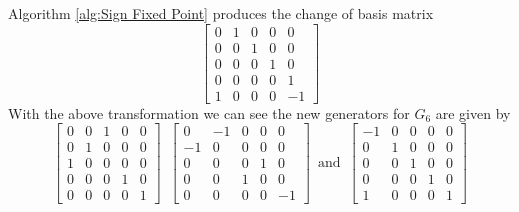 \documentclass{article}
\theoremstyle{plain}
\theoremstyle{definition}
\newcommand{\tand}{\ensuremath{\,\,\, \text{and} \,\,\,}}
\begin{document}
%
Algorithm \ref{alg:Sign Fixed Point} produces the change of basis matrix 
$$
 \left[ \begin {array}{ccccc} 0&1&0&0&0\\ 0&0&1&0&0
\\ 0&0&0&1&0\\ 0&0&0&0&1
\\ 1&0&0&0&-1\end {array} \right]
$$
With the above transformation we can see the new generators for $G_6$ are given by 
$$
 \left[ \begin {array}{cccc|c} 0&0&1&0&0\\ 0&1&0&0&0
\\ 1&0&0&0&0\\ 0&0&0&1&0
\\ \hline 0&0&0&0&1\end {array} \right] 
\,\,\,
 \left[ \begin {array}{cccc|c} 0&-1&0&0&0\\ -1&0&0&0&0
\\ 0&0&0&1&0\\ 0&0&1&0&0
\\ \hline 0&0&0&0&-1\end {array} \right] 
\tand
 \left[ \begin {array}{cccc|c} -1&0&0&0&0\\ 0&1&0&0&0
\\ 0&0&1&0&0\\ 0&0&0&1&0
\\ \hline 1&0&0&0&1\end {array} \right] 
$$
\end{document}

